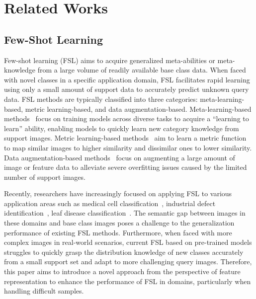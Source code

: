 \section{Related Works}
\label{sec:related}



\subsection{Few-Shot Learning}

{\color{recolor}Few-shot learning (FSL) aims to acquire generalized meta-abilities or meta-knowledge from a large volume of readily available base class data. When faced with novel classes in a specific application domain, FSL facilitates rapid learning using only a small amount of support data to accurately predict unknown query data.}
FSL methods are typically classified into three categories: meta-learning-based, metric learning-based, and data augmentation-based. 
Meta-learning-based methods~\cite{FinnAL17, FallahMO21, QinSJ23} focus on training models across diverse tasks to acquire a ``learning to learn'' ability, enabling models to quickly learn new category knowledge from support images.
Metric learning-based methods~\cite{ZhangCLS23, XieLLWL22, ZhangLYCCC24} aim to learn a metric function to map similar images to higher similarity and dissimilar ones to lower similarity. 
Data augmentation-based methods~\cite{YangWLX22, XuLHAS21, Song0CMS23} focus on augmenting a large amount of image or feature data to alleviate severe overfitting issues caused by the limited number of support images.

Recently, researchers have increasingly focused on applying FSL to various application areas such as medical cell classification~\cite{GuoDJGTWZ23}, industrial defect identification~\cite{ZhouLZWC23}, leaf disease classification~\cite{GargS23a, BeiCZHZ24}. The semantic gap between images in these domains and base class images poses a challenge to the generalization performance of existing FSL methods. Furthermore, when faced with more complex images in real-world scenarios, current FSL based on pre-trained models struggles to quickly grasp the distribution knowledge of new classes accurately from a small support set and adapt to more challenging query images. Therefore, this paper aims to introduce a novel approach from the perspective of feature representation to enhance the performance of FSL in domains, particularly when handling difficult samples.

